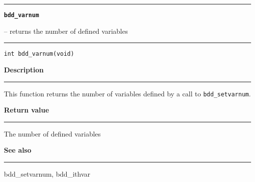\begin{minipage}{\textwidth}

\noindent\begin{minipage}{\textwidth}
\rule{\textwidth}{0.5mm}
{\tt\bf bdd\_varnum }
\--- returns the number of defined variables  \hspace{\fill}
\\\rule[1.5ex]{\textwidth}{0.5mm}
\end{minipage}

\noindent\begin{verbatim}
int bdd_varnum(void) 
\end{verbatim}

\vspace{\parsep}\noindent
{\bf Description}\\\rule[1.5ex]{\textwidth}{0.2mm}\vspace{-1.5ex}\setlength{\parindent}{1em}
This function returns the number of variables defined by
           a call to {\tt bdd\_setvarnum}.

\setlength{\parindent}{0em}\vspace{\parsep}\vspace{\baselineskip}\noindent
{\bf Return value}\\\rule[1.5ex]{\textwidth}{0.2mm}\vspace{-1.5ex}
The number of defined variables 

\vspace{\parsep}\vspace{\baselineskip}\noindent
{\bf See also}\\\rule[1.5ex]{\textwidth}{0.2mm}\vspace{-1.5ex}
bdd\_setvarnum, bdd\_ithvar 
\end{minipage}
\vspace{8ex}
